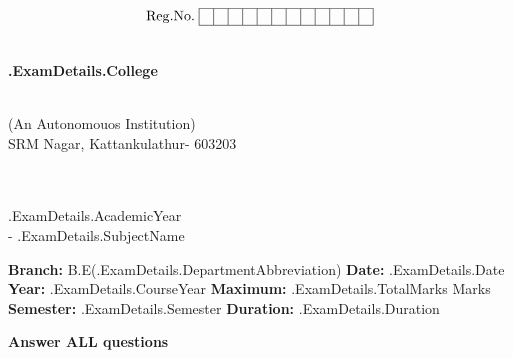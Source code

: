 \documentclass[12pt, a4paper]{exam}
\begin{document}
\hspace{0.75in}
\begin{minipage}[c]{0.8\textwidth}
	\begin{adjustwidth}{\dimexpr\linewidth-3.5cm}{\dimexpr\linewidth-0.80cm} 
	\[
		\mathrm{Reg.No.}    \hspace{0.1cm}
\begin{array}{|*{12}{c|}}
\hline
 & & & & & & & & & & & \\
\hline
\end{array}
\]
\end{adjustwidth}
	\begin{center}
		 \\
		\vspace{0.45cm}
		\large	\textbf {{.ExamDetails.College}} \par \\
		\small (An Autonomouos Institution) \\
		\small SRM Nagar, Kattankulathur- 603203 \\
			\par \\
		\vspace{0.35cm}
		 \\
		\small {{.ExamDetails.AcademicYear}} \\
		\vspace{0.35cm}
		 - {{.ExamDetails.SubjectName}} \\
	\end{center}

	\textbf{Branch: } B.E({{.ExamDetails.DepartmentAbbreviation}}) \hfill \textbf{Date: } {{.ExamDetails.Date}} \\
	\textbf{Year: } {{.ExamDetails.CourseYear}} \hfill \textbf{Maximum: } {{.ExamDetails.TotalMarks}} Marks \\
	\textbf{Semester: } {{.ExamDetails.Semester}} \hfill \textbf{Duration: } {{.ExamDetails.Duration}} \\

	\begin{center} \textbf{Answer ALL questions} \end{center}
\end{minipage}
\par
\vspace{0.2in}
\noindent
\par 
\vspace{0.25in}
\end{document}
